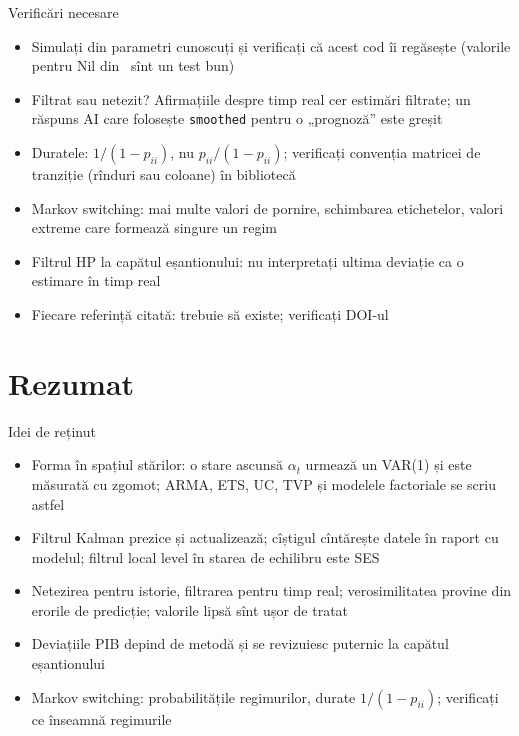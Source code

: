\begin{frame}{Verificări necesare}
\itemsize{\small}
\begin{itemize}
    \item Simulați din parametri cunoscuți și verificați că acest cod îi regăsește (valorile pentru Nil din \ sînt un test bun)
    \item Filtrat sau netezit? Afirmațiile despre timp real cer estimări filtrate; un răspuns AI care folosește \texttt{smoothed} pentru o „prognoză” este greșit
    \item Duratele: $1/(1 - p_{ii})$, nu $p_{ii}/(1 - p_{ii})$; verificați convenția matricei de tranziție (rînduri sau coloane) în bibliotecă
    \item Markov switching: mai multe valori de pornire, schimbarea etichetelor, valori extreme care formează singure un regim
    \item Filtrul HP la capătul eșantionului: nu interpretați ultima deviație ca o estimare în timp real
    \item Fiecare referință citată: trebuie să existe; verificați DOI-ul
\end{itemize}
\end{frame}


\section{Rezumat}

\begin{frame}{Idei de reținut}
\itemsize{\small}
\begin{itemize}
    \item Forma în spațiul stărilor: o stare ascunsă $\alpha_t$ urmează un VAR(1) și este măsurată cu zgomot; ARMA, ETS, UC, TVP și modelele factoriale se scriu astfel
    \item Filtrul Kalman prezice și actualizează; cîștigul cîntărește datele în raport cu modelul; filtrul local level în starea de echilibru este SES
    \item Netezirea pentru istorie, filtrarea pentru timp real; verosimilitatea provine din erorile de predicție; valorile lipsă sînt ușor de tratat
    \item Deviațiile PIB depind de metodă și se revizuiesc puternic la capătul eșantionului
    \item Markov switching: probabilitățile regimurilor, durate $1/(1 - p_{ii})$; verificați ce înseamnă regimurile
\end{itemize}
\end{frame}

